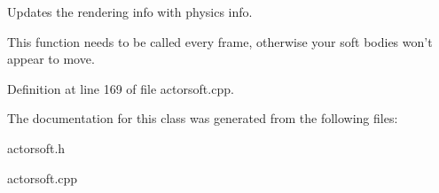 Updates the rendering info with physics info. 

This function needs to be called every frame, otherwise your soft bodies won't appear to move. 

Definition at line 169 of file actorsoft.cpp.



The documentation for this class was generated from the following files:\begin{DoxyCompactItemize}
\item 
actorsoft.h\item 
actorsoft.cpp\end{DoxyCompactItemize}
